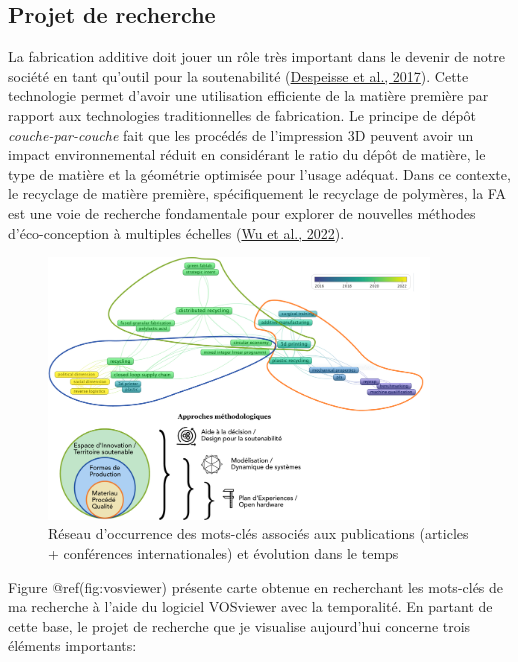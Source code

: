 \documentclass[
  11pt,
]{article}
\begin{document}
\hypertarget{projet-de-recherche}{%
\subsection{Projet de recherche}\label{projet-de-recherche}}

La fabrication additive doit jouer un rôle très important dans le
devenir de notre société en tant qu'outil pour la soutenabilité
(\protect\hyperlink{ref-Despeisse2016}{Despeisse et al., 2017}). Cette
technologie permet d'avoir une utilisation efficiente de la matière
première par rapport aux technologies traditionnelles de fabrication. Le
principe de dépôt \emph{couche-par-couche} fait que les procédés de
l'impression 3D peuvent avoir un impact environnemental réduit en
considérant le ratio du dépôt de matière, le type de matière et la
géométrie optimisée pour l'usage adéquat. Dans ce contexte, le recyclage
de matière première, spécifiquement le recyclage de polymères, la FA est
une voie de recherche fondamentale pour explorer de nouvelles méthodes
d'éco-conception à multiples échelles
(\protect\hyperlink{ref-Wu2021a}{Wu et al., 2022}).

\begin{figure}[H]

{\centering \includegraphics[width=0.9\textwidth,height=\textheight]{Figures/Vosviewer/Vosviewer-Fabio.pdf}

}

\caption{Réseau d'occurrence des mots-clés associés aux publications
(articles + conférences internationales) et évolution dans le temps}

\end{figure}

Figure @ref(fig:vosviewer) présente carte obtenue en recherchant les
mots-clés de ma recherche à l'aide du logiciel VOSviewer avec la
temporalité. En partant de cette base, le projet de recherche que je
visualise aujourd'hui concerne trois éléments importants:
\end{document}
